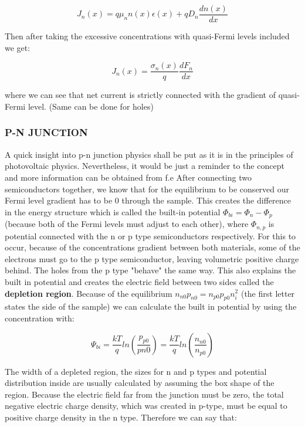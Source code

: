 \begin{equation}
J_n(x) = q\mu _n n(x)\epsilon (x)+ qD_n\frac{dn(x)}{dx}
\end{equation}

Then after taking the excessive concentrations with quasi-Fermi levels included we get:

\begin{equation}
J_n(x) = \frac{\sigma _n (x)}{q}\frac{dF_n}{dx}
\end{equation}

where we can see that net current is strictly connected with the gradient of quasi-Fermi level. (Same can be done for holes)

\subsubsection{P-N JUNCTION}
A quick insight into p-n junction physics shall be put as it is in the principles of photovoltaic physics. Nevertheless, it would be just a reminder to the concept and more information can be obtained from f.e \cite{sze}
After connecting two semiconductors together, we know that for the equilibrium to be conserved our Fermi level gradient has to be 0 through the sample. This creates the difference in the energy structure which is called the built-in  potential $\Phi _{bi} = \Phi _n - \Phi _p$(because both of the Fermi levels must adjust to each other), where $\Phi _{n,p}$ is potential connected with the n or p type semiconductors respectively. For this to occur, because of the concentrations gradient between both materials, some of the electrons must go to the p type semiconductor, leaving volumetric positive charge behind. The holes from the p type "behave" the same way. This also explains the built in potential and creates the electric field between two sides called the\textbf{ depletion region}. Because of the equilibrium $n_{n0}p_{n0}=n_{p0}p_{p0}n_i^2$ (the first letter states the side of the sample) we can calculate the built in potential by using the concentration with:

\begin{equation}
\Psi _{bi} = \frac{kT}{q}ln(\frac{p_{p0}}{p{n0}})=\frac{kT}{q}ln(\frac{n_{n0}}{n_{p0}})
\end{equation}

The width of a depleted region, the sizes for n and p types and potential distribution inside are usually calculated by assuming the box shape of the region. Because the electric field far from the junction must be zero, the total negative electric charge density, which was created in p-type, must be equal to positive charge density in the n type. Therefore we can say that:

